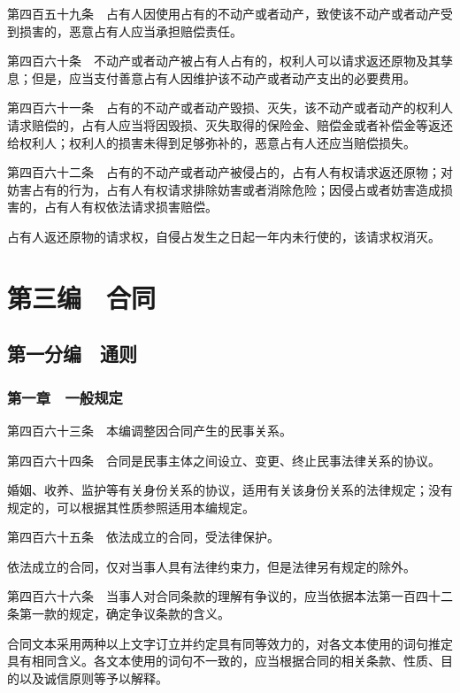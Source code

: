 \documentclass[UTF8,12pt,a4paper]{ctexbook}
\begin{document}
第四百五十九条　占有人因使用占有的不动产或者动产，致使该不动产或者动产受到损害的，恶意占有人应当承担赔偿责任。

第四百六十条　不动产或者动产被占有人占有的，权利人可以请求返还原物及其孳息；但是，应当支付善意占有人因维护该不动产或者动产支出的必要费用。

第四百六十一条　占有的不动产或者动产毁损、灭失，该不动产或者动产的权利人请求赔偿的，占有人应当将因毁损、灭失取得的保险金、赔偿金或者补偿金等返还给权利人；权利人的损害未得到足够弥补的，恶意占有人还应当赔偿损失。

第四百六十二条　占有的不动产或者动产被侵占的，占有人有权请求返还原物；对妨害占有的行为，占有人有权请求排除妨害或者消除危险；因侵占或者妨害造成损害的，占有人有权依法请求损害赔偿。

占有人返还原物的请求权，自侵占发生之日起一年内未行使的，该请求权消灭。

\cleardoublepage
{}
\part*{第三编　合同}

\cleardoublepage
{}
\chapter*{第一分编　通则}

\section*{第一章　一般规定}

第四百六十三条　本编调整因合同产生的民事关系。

第四百六十四条　合同是民事主体之间设立、变更、终止民事法律关系的协议。

婚姻、收养、监护等有关身份关系的协议，适用有关该身份关系的法律规定；没有规定的，可以根据其性质参照适用本编规定。

第四百六十五条　依法成立的合同，受法律保护。

依法成立的合同，仅对当事人具有法律约束力，但是法律另有规定的除外。

第四百六十六条　当事人对合同条款的理解有争议的，应当依据本法第一百四十二条第一款的规定，确定争议条款的含义。

合同文本采用两种以上文字订立并约定具有同等效力的，对各文本使用的词句推定具有相同含义。各文本使用的词句不一致的，应当根据合同的相关条款、性质、目的以及诚信原则等予以解释。
\end{document}
